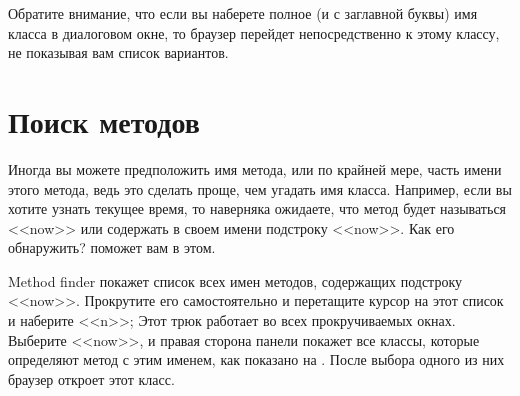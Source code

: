 \documentclass[a4paper,10pt,twoside]{book}
\begin{document}
Обратите внимание, что если вы наберете полное (и с заглавной буквы)
имя класса в диалоговом окне, то браузер перейдет непосредственно 
к этому классу, не показывая вам список вариантов. 


\section{Поиск методов}


Иногда вы можете предположить имя метода, или по крайней мере,
часть имени этого метода, ведь это сделать проще, чем угадать имя
класса. Например, если вы хотите узнать текущее время, то наверняка
ожидаете, что метод будет называться <<now>> или содержать в своем
имени подстроку <<now>>. Как его обнаружить?
 поможет вам в этом.


Method finder покажет список всех имен методов, содержащих подстроку
<<now>>. Прокрутите его самостоятельно и перетащите курсор на этот
список и наберите <<n>>; Этот трюк работает во всех прокручиваемых
окнах. Выберите <<now>>,  и правая сторона панели  покажет все
классы, которые определяют метод с этим именем, как показано на
. После выбора одного из них браузер
откроет этот класс. 
\end{document}
